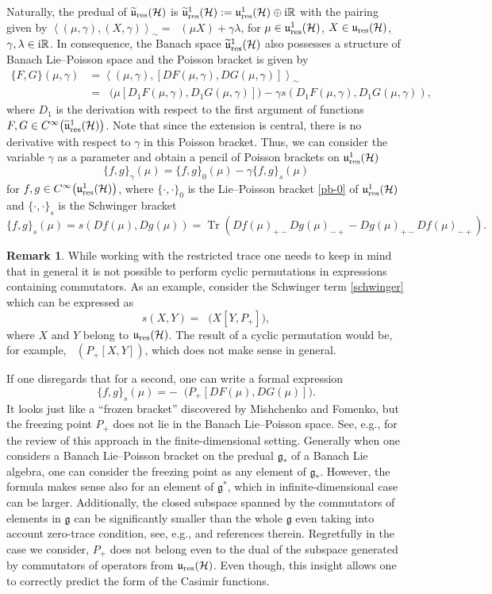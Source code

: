 \documentclass[pdftex]{sigma}
\theoremstyle{definition}
\newtheorem{rem}[thm]{Remark}
\numberwithin{equation}{section}
\newcommand{\pair}[2]{\left\langle #1 , #2 \right\rangle}
\newcommand{\R}{\mathbb R}
\renewcommand{\H}{\mathcal{H}}
\newcommand{\g}{\mathfrak{g}}
\newcommand{\ur}{\mathfrak u_{\textnormal{res}}(\H)}
\newcommand{\urp}{\mathfrak u_{\textnormal{res}}^1(\H)}
\newcommand{\urt}{\widetilde{\mathfrak u}_{\textnormal{res}}(\H)}
\newcommand{\urtp}{\widetilde{\mathfrak u}_{\textnormal{res}}^1(\H)}
\DeclareMathOperator{\Tr}{Tr}
\DeclareMathOperator{\Trr}{Tr_{res}}
\newcommand{\pb}{\{\cdot,\cdot\}}
\newcommand{\be}{\begin{equation}}
\newcommand{\ee}{\end{equation}}
\begin{document}
Naturally, the predual of $\urt$ is
$\urtp:=\urp\oplus {\rm i}\R$
with the pairing given by
$ \pair{(\mu,\gamma)}{(X,\gamma)}_{\sim}=\Trr(\mu X)+\gamma\lambda$,
for $\mu\in\urp$, $X\in\ur$, $\gamma,\lambda\in {\rm i}\R$.
In consequence, the Banach space $\urtp$ also possesses a structure of Banach Lie--Poisson space and the Poisson bracket is given by
\begin{align*}
 \{F,G\}(\mu,\gamma)& = \pair{(\mu,\gamma)}{[DF(\mu,\gamma),DG(\mu,\gamma)]}_\sim\\
& =\Trr\bigl(\mu [D_1F(\mu,\gamma),D_1G(\mu,\gamma)]\bigr)-\gamma s(D_1F(\mu,\gamma),D_1G(\mu,\gamma)),
\end{align*}
where $D_1$ is the derivation with respect to the first argument of functions $F,G\in C^\infty\bigl(\urtp\bigr)$.
Note that since the extension is central, there is no derivative with respect to $\gamma$ in this Poisson bracket. Thus, we can
consider the variable $\gamma$ as a parameter and obtain a pencil of Poisson brackets on $\urp$
\be \label{pb-pencil}\{f,g\}_\gamma(\mu) =
\{f,g\}_0(\mu) - \gamma \{f,g\}_s(\mu) \ee
for $f,g\in C^\infty\bigl(\urp\bigr)$, where $\pb_0$ is the Lie--Poisson bracket \eqref{pb-0} of $\urp$ and $\pb_s$ is the Schwinger bracket
\be \label{pb-s}\{f,g\}_s(\mu) = s(Df(\mu),Dg(\mu))= \Tr (Df(\mu)_{+-}Dg(\mu)_{-+} - Dg(\mu)_{+-}Df(\mu)_{-+}).\ee

\begin{rem}\label{frozen}
While working with the restricted trace one needs to keep in mind that in general it is not possible to perform cyclic permutations in expressions containing commutators. As an example, consider the Schwinger term \eqref{schwinger} which can be expressed as
\begin{equation}\label{schwinger_expression}
s(X, Y) = \Trr\bigl(X[Y,P_+]\bigr),
\end{equation}
where $X$ and $Y$ belong to $\ur$. The result of a cyclic permutation would be, for example, $\Trr(P_+[X, Y])$, which does not make sense in general.

If one disregards that for a second, one can write a formal expression
\[ \{f,g\}_s(\mu)=-\Trr\bigl( P_+ [DF(\mu),DG(\mu)]\bigr). \]
It looks just like a ``frozen bracket'' discovered by Mishchenko and Fomenko, but the freezing point $P_+$ does not lie in the Banach Lie--Poisson space. See, e.g., \cite{bols-bor,fomenko-trofimov} for the review of this approach in the finite-dimensional setting. Generally when one considers a Banach Lie--Poisson bracket on the predual $\g_*$ of a Banach Lie algebra, one can consider the freezing point as any element of $\g_*$. However, the formula makes sense also for an element of $\g^*$, which in infinite-dimensional case can be larger. Additionally, the closed subspace spanned by the commutators of elements in $\g$ can be significantly smaller than the whole $\g$ even taking into account zero-trace condition, see, e.g., \cite{kalton89} and references therein. Regretfully in the case we consider, $P_+$ does not belong even to the dual of the subspace generated by commutators of operators from $\ur$. Even though, this insight allows one to correctly predict the form of the Casimir functions.
\end{rem}
\end{document}

